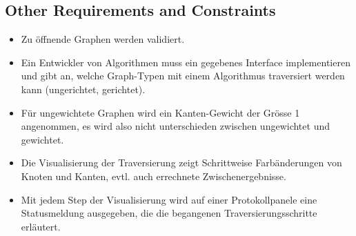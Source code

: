 \subsection{Other Requirements and Constraints}	
\label{subsec:Other Requirements and Constraints}
\begin{itemize}
  \item Zu \"offnende Graphen werden validiert.
  \item Ein Entwickler von Algorithmen muss ein gegebenes Interface implementieren und gibt an, welche Graph-Typen mit einem Algorithmus traversiert werden kann (ungerichtet, gerichtet).
  \item F\"ur ungewichtete Graphen wird ein Kanten-Gewicht der Gr\"osse 1 angenommen, es wird also nicht unterschieden zwischen ungewichtet und gewichtet.
  \item Die Visualisierung der Traversierung zeigt Schrittweise Farb\"anderungen von Knoten und Kanten, evtl. auch errechnete Zwischenergebnisse.
  \item Mit jedem Step der Visualisierung wird auf einer Protokollpanele eine Statusmeldung ausgegeben, die die begangenen Traversierungsschritte erl\"autert.
\end{itemize}